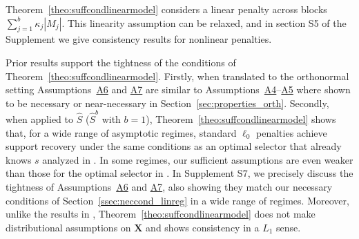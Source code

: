 \documentclass[bj,authoryear]{imsart}
\theoremstyle{plain}
\newcommand{\bs}{\boldsymbol}
\begin{document}
Theorem~\ref{theo:suffcondlinearmodel} considers a linear penalty across blocks
$\sum_{j=1}^b \kappa_j|M_j|$. This linearity assumption can be relaxed, and in section S5 of the Supplement we give consistency results for nonlinear penalties. 

Prior results support the tightness of the conditions of Theorem~\ref{theo:suffcondlinearmodel}. Firstly, when translated to the orthonormal setting Assumptions~\hyperlink{lab:A6}{A6} and \hyperlink{lab:A7}{A7} are similar to Assumptions~\hyperlink{lab:A4}{A4}--\hyperlink{lab:A5}{A5} where shown to be necessary or near-necessary in Section~\ref{sec:properties_orth}. Secondly, when applied to $\hat{S}$ ($\hat{S}^b$ with $b=1$), Theorem~\ref{theo:suffcondlinearmodel} shows that, for a wide range of asymptotic regimes, standard $\ell_0$ penalties achieve support recovery under the same conditions as an optimal selector that already knows $s$ analyzed in \cite{infotheowainwright}. In some regimes, our sufficient assumptions are even weaker than those for the optimal selector in \cite{infotheowainwright}. In Supplement S7, we precisely discuss the tightness of Assumptions~\hyperlink{lab:A6}{A6} and \hyperlink{lab:A7}{A7}, also showing they match our necessary conditions of Section~\ref{ssec:neccond_linreg} in a wide range of regimes. Moreover, unlike the results in \cite{infotheowainwright}, Theorem~\ref{theo:suffcondlinearmodel} does not make distributional assumptions on $\bs X$ and shows consistency in a $L_1$ sense.
\end{document}
